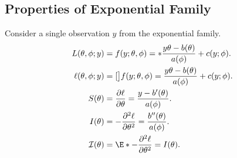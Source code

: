 \documentclass{article}\usepackage[]{graphicx}\usepackage[svgnames]{xcolor}
\let\exp\relax%
\let\log\relax%
\begin{document}
\subsection*{Properties of Exponential Family}
Consider a single observation $y$ from the exponential family.
\begin{align*}
    L(\theta,\phi;y)    & =f(y;\theta,\phi)=\exp*{\frac{y\theta-b(\theta)}{a(\phi)}+c(y;\phi)}.      \\
    \ell(\theta,\phi;y) & =\log[\big]{f(y;\theta,\phi)}=\frac{y\theta-b(\theta)}{a(\phi)}+c(y;\phi). \\
    S(\theta)           & =\pdv{\ell}{\theta}=\frac{y-b^\prime(\theta)}{a(\phi)}.                    \\
    I(\theta)           & =-\pdv[order=2]{\ell}{\theta}=\frac{b^{\prime\prime}(\theta)}{a(\phi)}.    \\
    \mathcal{I}(\theta) & =\E*{-\pdv[order=2]{\ell}{\theta}}=I(\theta).
\end{align*}
\end{document}
